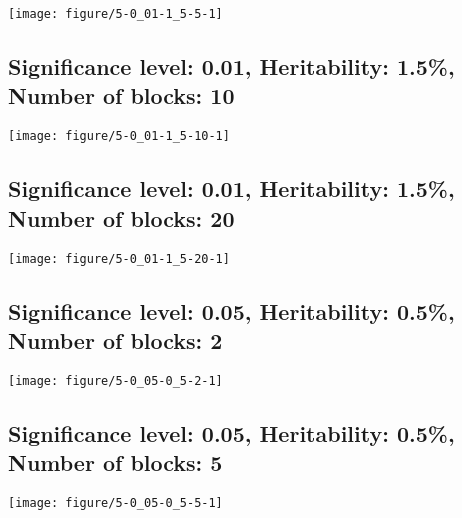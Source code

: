 \documentclass[11pt,letter]{article}\usepackage[]{graphicx}\usepackage[]{color}
\makeatletter
\def\maxwidth{ %
  \ifdim\Gin@nat@width>\linewidth
    \linewidth
  \else
    \Gin@nat@width
  \fi
}
\newenvironment{knitrout}{}{} %
\makeatother
\begin{document}
\begin{knitrout}
\color{fgcolor}
\texttt{[image: figure/5-0\_01-1\_5-5-1]} 

\end{knitrout}

\newpage
\subsection{Significance level: 0.01, Heritability: 1.5\%, Number of blocks: 10}

\begin{knitrout}
\color{fgcolor}
\texttt{[image: figure/5-0\_01-1\_5-10-1]} 

\end{knitrout}

\newpage
\subsection{Significance level: 0.01, Heritability: 1.5\%, Number of blocks: 20}

\begin{knitrout}
\color{fgcolor}
\texttt{[image: figure/5-0\_01-1\_5-20-1]} 

\end{knitrout}

\newpage
\subsection{Significance level: 0.05, Heritability: 0.5\%, Number of blocks: 2}

\begin{knitrout}
\color{fgcolor}
\texttt{[image: figure/5-0\_05-0\_5-2-1]} 

\end{knitrout}

\newpage
\subsection{Significance level: 0.05, Heritability: 0.5\%, Number of blocks: 5}

\begin{knitrout}
\color{fgcolor}
\texttt{[image: figure/5-0\_05-0\_5-5-1]} 

\end{knitrout}
\end{document}
